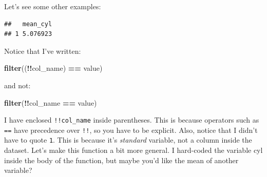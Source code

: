 \documentclass[]{gitbook}
\newenvironment{Shaded}{\begin{snugshade}}{\end{snugshade}}
\newcommand{\ControlFlowTok}[1]{\textcolor[rgb]{0.13,0.29,0.53}{\textbf{#1}}}
\newcommand{\DataTypeTok}[1]{\textcolor[rgb]{0.13,0.29,0.53}{#1}}
\newcommand{\DecValTok}[1]{\textcolor[rgb]{0.00,0.00,0.81}{#1}}
\newcommand{\KeywordTok}[1]{\textcolor[rgb]{0.13,0.29,0.53}{\textbf{#1}}}
\newcommand{\NormalTok}[1]{#1}
\newcommand{\OperatorTok}[1]{\textcolor[rgb]{0.81,0.36,0.00}{\textbf{#1}}}
\newcommand{\StringTok}[1]{\textcolor[rgb]{0.31,0.60,0.02}{#1}}
\theoremstyle{definition}
\theoremstyle{definition}
\theoremstyle{definition}
\theoremstyle{remark}
\begin{document}
Let's see some other examples:

\begin{Shaded}
\end{Shaded}

\begin{verbatim}
##   mean_cyl
## 1 5.076923
\end{verbatim}

Notice that I've written:

\begin{Shaded}
\begin{Highlighting}[]
\KeywordTok{filter}\NormalTok{((}\OperatorTok{!!}\NormalTok{col_name) }\OperatorTok{==}\StringTok{ }\NormalTok{value)}
\end{Highlighting}
\end{Shaded}

and not:

\begin{Shaded}
\begin{Highlighting}[]
\KeywordTok{filter}\NormalTok{(}\OperatorTok{!!}\NormalTok{col_name }\OperatorTok{==}\StringTok{ }\NormalTok{value)}
\end{Highlighting}
\end{Shaded}

I have enclosed \texttt{!!col\_name} inside parentheses. This is because
operators such as \texttt{==} have precedence over \texttt{!!}, so you
have to be explicit. Also, notice that I didn't have to quote
\texttt{1}. This is because it's \emph{standard} variable, not a column
inside the dataset. Let's make this function a bit more general. I
hard-coded the variable cyl inside the body of the function, but maybe
you'd like the mean of another variable?
\end{document}
